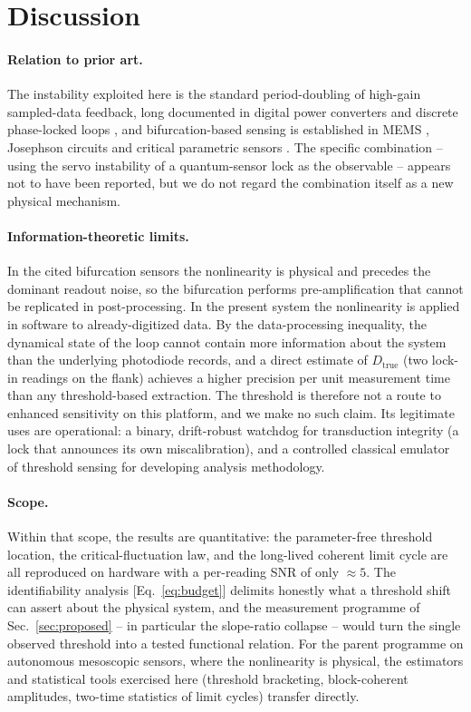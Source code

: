 \documentclass[11pt,a4paper]{article}
\newcommand{\Dtrue}{D_{\mathrm{true}}}
\begin{document}
\section{Discussion}
\label{sec:discussion}

\paragraph{Relation to prior art.} The instability exploited here is the
standard period-doubling of high-gain sampled-data feedback, long documented
in digital power converters and discrete phase-locked loops
\cite{Banerjee2001}, and bifurcation-based sensing is established in MEMS
\cite{MEMSunlock2023,MEMSmass2020}, Josephson circuits \cite{Siddiqi2004} and
critical parametric sensors \cite{DiCandia2023,PRXQ2025}. The specific
combination -- using the servo instability of a quantum-sensor lock as the
observable -- appears not to have been reported, but we do not regard the
combination itself as a new physical mechanism.

\paragraph{Information-theoretic limits.} In the cited bifurcation sensors
the nonlinearity is physical and precedes the dominant readout noise, so the
bifurcation performs pre-amplification that cannot be replicated in
post-processing. In the present system the nonlinearity is applied in
software to already-digitized data. By the data-processing inequality, the
dynamical state of the loop cannot contain more information about the system
than the underlying photodiode records, and a direct estimate of
$\Dtrue$ (two lock-in readings on the flank) achieves a higher precision per
unit measurement time than any threshold-based extraction. The threshold is
therefore not a route to enhanced sensitivity on this platform, and we make no
such claim. Its legitimate uses are operational: a binary, drift-robust
watchdog for transduction integrity (a lock that announces its own
miscalibration), and a controlled classical emulator of threshold sensing for
developing analysis methodology.

\paragraph{Scope.} Within that scope, the results are quantitative: the
parameter-free threshold location, the critical-fluctuation law, and the
long-lived coherent limit cycle are all reproduced on hardware with a
per-reading SNR of only $\approx 5$. The identifiability analysis
[Eq.~\eqref{eq:budget}] delimits honestly what a threshold shift can assert
about the physical system, and the measurement programme of
Sec.~\ref{sec:proposed} -- in particular the slope-ratio collapse -- would
turn the single observed threshold into a tested functional relation. For the
parent programme on autonomous mesoscopic sensors, where the nonlinearity is
physical, the estimators and statistical tools exercised here (threshold
bracketing, block-coherent amplitudes, two-time statistics of limit cycles)
transfer directly.
\end{document}
